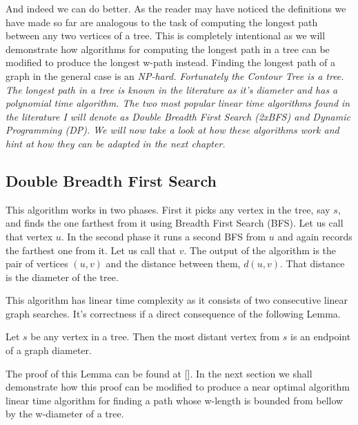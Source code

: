 And indeed we can do better. As the reader may have noticed the definitions we have made so far are analogous to the task of computing the longest path between any two vertices of a tree. This is completely intentional as we will demonstrate how algorithms for computing the longest path in a tree can be modified to produce the longest w-path instead. Finding the longest path of a graph in the general case is an \em NP-hard\em. Fortunately the Contour Tree is a tree. The longest path in a tree is known in the literature as it's diameter and has a polynomial time algorithm. The two most popular linear time algorithms found in the literature I will denote as Double Breadth First Search (2xBFS) and Dynamic Programming (DP). We will now take a look at how these algorithms work and hint at how they can be adapted in the next chapter.


\subsection{Double Breadth First Search}

This algorithm works in two phases. First it picks any vertex in the tree, say $s$, and finds the one farthest from it using Breadth First Search (BFS). Let us call that vertex $u$. In the second phase it runs a second BFS from $u$ and again records the farthest one from it. Let us call that $v$. The output of the algorithm is the pair of vertices $(u, v)$ and the distance between them, $d(u, v)$. That distance is the diameter of the tree.

This algorithm has linear time complexity as it consists of two consecutive linear graph searches. It's correctness if a direct consequence of the following Lemma.

\begin{lem} Let $s$ be any vertex in a tree. Then the most distant vertex from $s$ is an endpoint of a graph diameter. \end{lem}


The proof of this Lemma can be found at []. In the next section we shall demonstrate how this proof can be modified to produce a near optimal algorithm linear time algorithm for finding a path whose w-length is bounded from bellow by the w-diameter of a tree.


